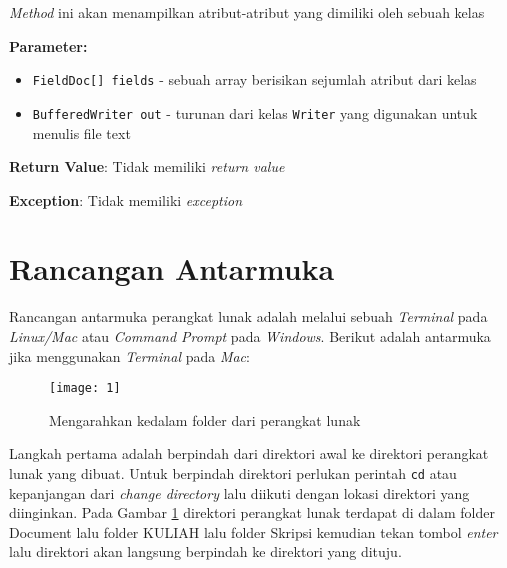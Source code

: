 \begin{enumerate}
\begin{itemize}
\textit{Method} ini akan menampilkan atribut-atribut yang dimiliki oleh
 sebuah kelas

\textbf{Parameter:}
\begin{itemize}
\item \texttt{FieldDoc[] fields} - 
sebuah array berisikan sejumlah atribut dari kelas
\item \texttt{BufferedWriter out} - 
turunan dari kelas \texttt{Writer} yang digunakan untuk menulis
 file text
\end{itemize}
\textbf{Return Value}: Tidak memiliki \textit{return value}

\textbf{Exception}: Tidak memiliki \textit{exception}

\end{itemize}
\end{enumerate}

\section{Rancangan Antarmuka}
\label{sec:antarmuka}
Rancangan antarmuka perangkat lunak adalah melalui sebuah {\it Terminal} pada {\it Linux/Mac} atau {\it Command Prompt} pada {\it Windows}. Berikut adalah antarmuka jika menggunakan {\it Terminal} pada {\it Mac}: 

\begin{figure}[H]
	\centering  
	\texttt{[image: 1]}  
	\caption[]{Mengarahkan kedalam folder dari perangkat lunak} 
	\label{fig:1} 
\end{figure}
Langkah pertama adalah berpindah dari direktori awal ke direktori perangkat lunak yang dibuat. Untuk berpindah direktori perlukan perintah \texttt{cd} atau kepanjangan dari {\it change directory} lalu diikuti dengan lokasi direktori yang diinginkan. Pada Gambar \ref{fig:1} direktori perangkat lunak terdapat di dalam folder Document lalu folder KULIAH lalu folder Skripsi kemudian tekan tombol {\it enter} lalu direktori akan langsung berpindah ke direktori yang dituju.

